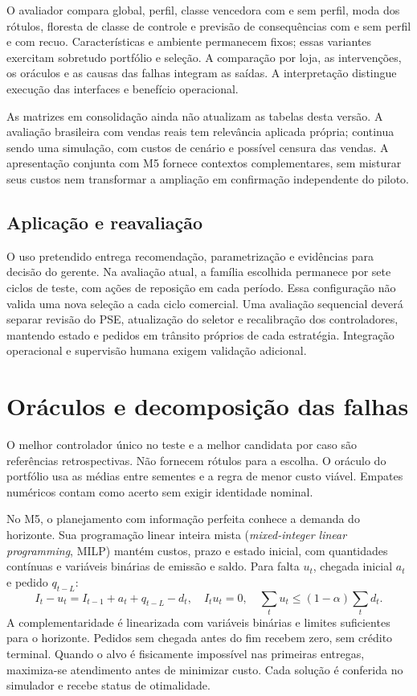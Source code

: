 O avaliador compara global, perfil, classe vencedora com e sem perfil, moda dos rótulos, floresta de classe de controle e previsão de consequências com e sem perfil e com recuo. Características e ambiente permanecem fixos; essas variantes exercitam sobretudo portfólio e seleção. A comparação por loja, as intervenções, os oráculos e as causas das falhas integram as saídas. A interpretação distingue execução das interfaces e benefício operacional.

As matrizes em consolidação ainda não atualizam as tabelas desta versão. A avaliação brasileira com vendas reais tem relevância aplicada própria; continua sendo uma simulação, com custos de cenário e possível censura das vendas. A apresentação conjunta com M5 fornece contextos complementares, sem misturar seus custos nem transformar a ampliação em confirmação independente do piloto.

\subsection{Aplicação e reavaliação}
\label{sec:aplicacao_aipe}
O uso pretendido entrega recomendação, parametrização e evidências para decisão do gerente. Na avaliação atual, a família escolhida permanece por sete ciclos de teste, com ações de reposição em cada período. Essa configuração não valida uma nova seleção a cada ciclo comercial. Uma avaliação sequencial deverá separar revisão do PSE, atualização do seletor e recalibração dos controladores, mantendo estado e pedidos em trânsito próprios de cada estratégia. Integração operacional e supervisão humana exigem validação adicional.

\section{Oráculos e decomposição das falhas}
O melhor controlador único no teste e a melhor candidata por caso são referências retrospectivas. Não fornecem rótulos para a escolha. O oráculo do portfólio usa as médias entre sementes e a regra de menor custo viável. Empates numéricos contam como acerto sem exigir identidade nominal.

No M5, o planejamento com informação perfeita conhece a demanda do horizonte. Sua programação linear inteira mista (\textit{mixed-integer linear programming}, MILP) mantém custos, prazo e estado inicial, com quantidades contínuas e variáveis binárias de emissão e saldo. Para falta $u_t$, chegada inicial $a_t$ e pedido $q_{t-L}$:
\[
 I_t-u_t=I_{t-1}+a_t+q_{t-L}-d_t,\quad
 I_tu_t=0,\quad \sum_tu_t\leq(1-\alpha)\sum_td_t.
\]
A complementaridade é linearizada com variáveis binárias e limites suficientes para o horizonte. Pedidos sem chegada antes do fim recebem zero, sem crédito terminal. Quando o alvo é fisicamente impossível nas primeiras entregas, maximiza-se atendimento antes de minimizar custo. Cada solução é conferida no simulador e recebe status de otimalidade.

